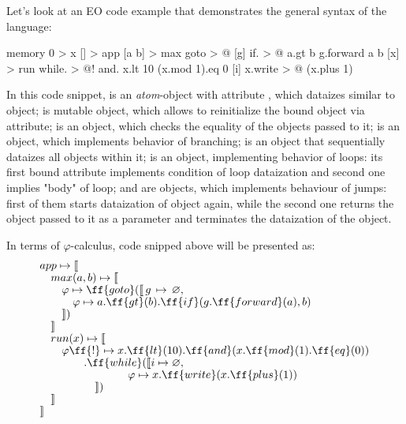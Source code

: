 \documentclass[sigplan,review,11pt,nonacm,natbib=false]{acmart}
\theoremstyle{theorems}
\newcommand\br{\\[-4pt]}
\begin{document}
Let's look at an EO code example that demonstrates the general syntax of the language:
\begin{ffcode}
memory 0 > x
[] > app
  [a b] > max
    goto > @
      [g]
        if. > @
          a.gt b
          g.forward a
          b
  [x] > run
    while. > @!
      and.
        x.lt 10
        (x.mod 1).eq 0
      [i]
        x.write > @
          (x.plus 1)
\end{ffcode}
In this code snippet,  is an \emph{atom}-object with attribute , which dataizes similar to  object;
 is mutable object, which allows to reinitialize the bound object  via  attribute;
 is an object, which checks the equality of the objects passed to it;
 is an object, which implements behavior of branching;
 is an object that sequentially dataizes all objects within it;
 is an object, implementing behavior of loops: its first bound attribute implements condition of loop dataization and second one implies "body" of loop;
 and  are objects, which implements behaviour of jumps: first of them starts dataization of object  again, while the second one returns the object passed to it as a parameter and terminates the dataization of the  object.

In terms of $\varphi$-calculus, code snipped above will be presented as:
\begin{equation}
\begin{split}
& app \mapsto \llbracket \br
& \quad max(a, b) \mapsto \llbracket \br
& \quad \quad \varphi \mapsto \ff{goto}(\llbracket\,g\,\mapsto\,\varnothing,\br
& \quad \quad \quad \varphi \mapsto a.\ff{gt}(b).\ff{if}(g.\ff{forward}(a), b) \br
& \quad \quad \rrbracket) \br
& \quad \rrbracket \br
& \quad run(x) \mapsto \llbracket \br
& \quad \quad \varphi\ff{!} \mapsto x.\ff{lt}(10).\ff{and}(x.\ff{mod}(1).\ff{eq}(0)) \br
& \quad \quad \quad \quad .\ff{while}(\llbracket i \mapsto \varnothing, \br
& \quad \quad \quad \quad \quad \quad \quad \quad \varphi \mapsto x.\ff{write}(x.\ff{plus}(1)) \br
& \quad \quad \quad \quad \quad \rrbracket) \br
& \quad \rrbracket \br
& \rrbracket \\
\end{split}
\end{equation}
\end{document}
